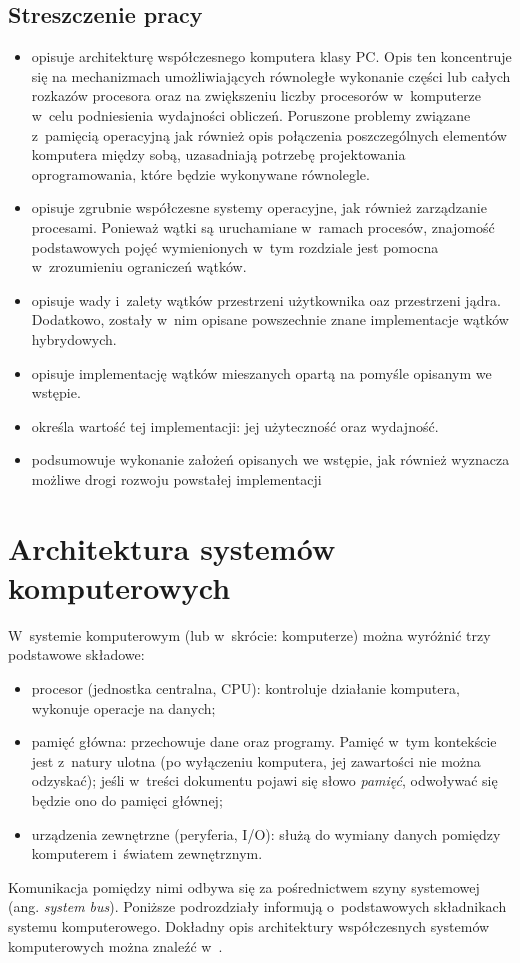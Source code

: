 \documentclass[12pt]{mwart}
\begin{document}
\subsection{Streszczenie pracy}
\indent
	\begin{itemize}
	\item[Rozdział \ref{sec:architecture}] opisuje architekturę współczesnego komputera klasy PC. Opis ten koncentruje się na 
		mechanizmach umożliwiających równoległe wykonanie części lub całych rozkazów procesora oraz na zwiększeniu liczby procesorów
		w~komputerze w~celu podniesienia wydajności obliczeń. Poruszone problemy związane z~pamięcią operacyjną jak również opis połączenia
		poszczególnych elementów komputera między sobą, uzasadniają potrzebę projektowania oprogramowania, które będzie wykonywane równolegle.
	\item[Rozdział \ref{sec:system}] opisuje zgrubnie współczesne systemy operacyjne, jak również zarządzanie procesami. Ponieważ wątki są 
		uruchamiane w~ramach procesów, znajomość podstawowych pojęć wymienionych w~tym rozdziale jest pomocna w~zrozumieniu ograniczeń wątków.
	\item[Rozdział \ref{sec:threads}] opisuje wady i~zalety wątków przestrzeni użytkownika oaz przestrzeni jądra. Dodatkowo, zostały w~nim
		opisane powszechnie znane implementacje wątków hybrydowych.
	\item[Rozdział \ref{sec:solution}] opisuje implementację wątków mieszanych opartą na pomyśle opisanym we wstępie.
	\item[Rozdział \ref{sec:analysis}] określa wartość tej implementacji: jej użyteczność oraz wydajność.
	\item[Rozdział \ref{sec:summary}] podsumowuje wykonanie założeń opisanych we wstępie, jak również wyznacza możliwe drogi rozwoju
		powstałej implementacji
	\end{itemize}
\par
%
\newpage
\section{Architektura systemów komputerowych}
%
\label{sec:architecture}
\indent 
	W~systemie komputerowym (lub w~skrócie: komputerze) można wyróżnić trzy podstawowe składowe:
	\begin{itemize}
		\item procesor (jednostka centralna, CPU): kontroluje działanie komputera, wykonuje operacje na danych;
		\item pamięć główna: przechowuje dane oraz programy. Pamięć w~tym kontekście jest z~natury ulotna (po wyłączeniu komputera,
			jej zawartości nie można odzyskać); jeśli w~treści dokumentu pojawi się słowo \emph{pamięć}, odwoływać się będzie ono do
			pamięci głównej;
		\item urządzenia zewnętrzne (peryferia, I/O): służą do wymiany danych pomiędzy komputerem i~światem zewnętrznym.
	\end{itemize}
	Komunikacja pomiędzy nimi odbywa się za pośrednictwem szyny systemowej (ang. \emph{system bus}).
	Poniższe podrozdziały informują o~podstawowych składnikach systemu komputerowego. Dokładny opis architektury współczesnych
	systemów komputerowych można znaleźć w~\cite{hennessy}.
\par
%
\end{document}
